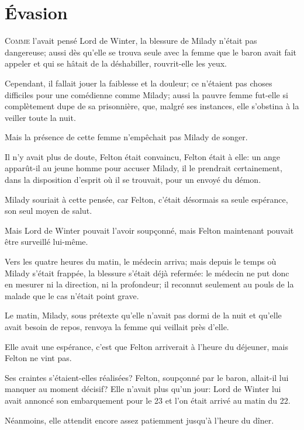 
\chapter{Évasion}

\lettrine{C}{omme} l'avait pensé Lord de Winter, la blessure de Milady n'était pas dangereuse; aussi dès qu'elle se trouva seule avec la femme que le baron avait fait appeler et qui se hâtait de la déshabiller, rouvrit-elle les yeux. 

Cependant, il fallait jouer la faiblesse et la douleur; ce n'étaient pas choses difficiles pour une comédienne comme Milady; aussi la pauvre femme fut-elle si complètement dupe de sa prisonnière, que, malgré ses instances, elle s'obstina à la veiller toute la nuit. 

Mais la présence de cette femme n'empêchait pas Milady de songer. 

Il n'y avait plus de doute, Felton était convaincu, Felton était à elle: un ange apparût-il au jeune homme pour accuser Milady, il le prendrait certainement, dans la disposition d'esprit où il se trouvait, pour un envoyé du démon. 

Milady souriait à cette pensée, car Felton, c'était désormais sa seule espérance, son seul moyen de salut. 

Mais Lord de Winter pouvait l'avoir soupçonné, mais Felton maintenant pouvait être surveillé lui-même. 

Vers les quatre heures du matin, le médecin arriva; mais depuis le temps où Milady s'était frappée, la blessure s'était déjà refermée: le médecin ne put donc en mesurer ni la direction, ni la profondeur; il reconnut seulement au pouls de la malade que le cas n'était point grave. 

Le matin, Milady, sous prétexte qu'elle n'avait pas dormi de la nuit et qu'elle avait besoin de repos, renvoya la femme qui veillait près d'elle. 

Elle avait une espérance, c'est que Felton arriverait à l'heure du déjeuner, mais Felton ne vint pas. 

Ses craintes s'étaient-elles réalisées? Felton, soupçonné par le baron, allait-il lui manquer au moment décisif? Elle n'avait plus qu'un jour: Lord de Winter lui avait annoncé son embarquement pour le 23 et l'on était arrivé au matin du 22. 

Néanmoins, elle attendit encore assez patiemment jusqu'à l'heure du dîner. 

